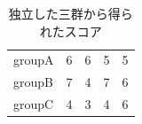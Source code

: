 \begin{table}[ht]
	\begin{center}
		\caption{独立した三群から得られたスコア}
		\begin{tabular}{l|llll}\hline
			groupA & 6 & 6 & 5 & 5 \\
			groupB & 7 & 4 & 7 & 6 \\
			groupC & 4 & 3 & 4 & 6 \\\hline
		\end{tabular}
		\label{tbl::21_01}
	\end{center}
\end{table}
